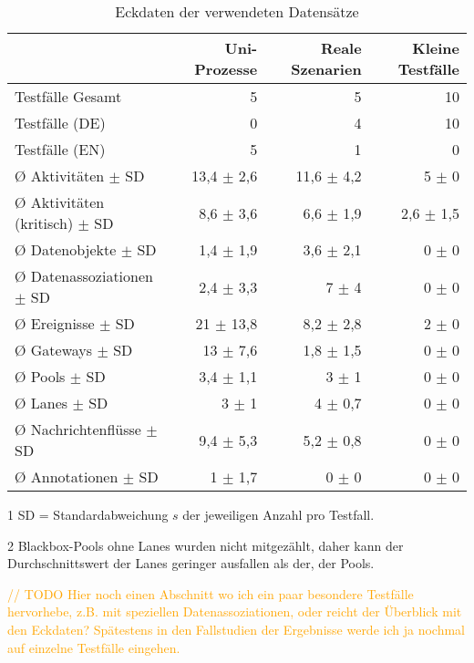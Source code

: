 \begin{table}[htbp]
    \centering
    \begin{threeparttable}
    \caption{Eckdaten der verwendeten Datensätze}
    \label{tab:datensaetze-eckdaten}
    \begin{tabular}{l r r r}
        \toprule
        & Uni-Prozesse & Reale Szenarien & Kleine Testfälle \\
        \midrule
        Testfälle Gesamt                  & 5  & 5  & 10 \\
        Testfälle (DE)                    & 0 & 4 & 10 \\
        Testfälle (EN)                    & 5 & 1 & 0 \\
        Ø Aktivitäten $\pm$ SD\tnote{1}   & 13,4 $\pm$ 2,6 & 11,6 $\pm$ 4,2 & 5 $\pm$ 0 \\
        Ø Aktivitäten (kritisch) $\pm$ SD & 8,6 $\pm$ 3,6 & 6,6 $\pm$ 1,9 & 2,6 $\pm$ 1,5 \\
        Ø Datenobjekte $\pm$ SD           & 1,4 $\pm$ 1,9 & 3,6 $\pm$ 2,1 & 0 $\pm$ 0 \\
        Ø Datenassoziationen $\pm$ SD     & 2,4 $\pm$ 3,3 & 7 $\pm$ 4 & 0 $\pm$ 0 \\
        Ø Ereignisse $\pm$ SD             & 21 $\pm$ 13,8 & 8,2 $\pm$ 2,8 & 2 $\pm$ 0 \\
        Ø Gateways $\pm$ SD               & 13 $\pm$ 7,6 & 1,8 $\pm$ 1,5 & 0 $\pm$ 0 \\
        Ø Pools $\pm$ SD                  & 3,4 $\pm$ 1,1 & 3 $\pm$ 1 & 0 $\pm$ 0 \\
        Ø Lanes $\pm$ SD\tnote{2}         & 3 $\pm$ 1 & 4 $\pm$ 0,7 & 0 $\pm$ 0 \\
        Ø Nachrichtenflüsse $\pm$ SD      & 9,4 $\pm$ 5,3 & 5,2 $\pm$ 0,8 & 0 $\pm$ 0 \\
        Ø Annotationen $\pm$ SD           & 1 $\pm$ 1,7 & 0 $\pm$ 0 & 0 $\pm$ 0 \\
        \bottomrule
    \end{tabular}
    \begin{tablenotes}
        \item[1] SD = Standardabweichung $s$ der jeweiligen Anzahl pro Testfall.
        \item[2] Blackbox-Pools ohne Lanes wurden nicht mitgezählt, daher kann der Durchschnittswert der Lanes geringer ausfallen als der, der Pools.
    \end{tablenotes}
    \end{threeparttable}
\end{table}

\textcolor{orange}{// TODO Hier noch einen Abschnitt wo ich ein paar besondere Testfälle hervorhebe, z.B. mit speziellen Datenassoziationen, oder reicht der Überblick mit den Eckdaten? Spätestens in den Fallstudien der Ergebnisse werde ich ja nochmal auf einzelne Testfälle eingehen.}
